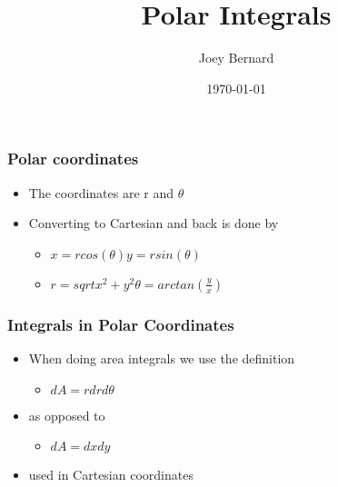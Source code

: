 \documentclass{beamer}
\title{Polar Integrals}
\author{Joey Bernard}
\institute{University of New Brunswick}
\date{\today}
\begin{document}
\begin{frame}
  \titlepage
\end{frame}

\begin{frame}
  \frametitle{Polar coordinates}
  \begin{itemize}
  \item The coordinates are r and $\theta$
  \item Converting to Cartesian and back is done by
    \begin{itemize}
    \item $x=r cos(\theta)       y=r sin(\theta)$
    \item $r=sqrt{x^2 + y^2}      \theta=arctan(\frac{y}{x})$
    \end{itemize}
  \end{itemize}
\end{frame}

\begin{frame}
  \frametitle{Integrals in Polar Coordinates}
  \begin{itemize}
  \item When doing area integrals we use the definition
    \begin{itemize}
    \item $dA = r dr d\theta$
    \end{itemize}
  \item as opposed to
    \begin{itemize}
    \item $dA = dx dy$
    \end{itemize}
    \item used in Cartesian coordinates
  \end{itemize}
\end{frame}
\end{document}
